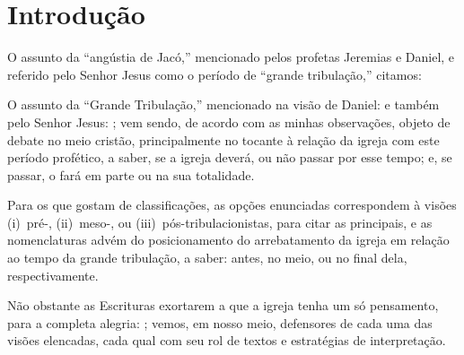 \section{Introdução}

    O assunto da ``angústia de Jacó,'' mencionado pelos profetas Jeremias e Daniel, e referido pelo Senhor Jesus como o período
    de ``grande tribulação,'' citamos:




    O assunto da ``Grande Tribulação,'' mencionado na visão de Daniel:  e também pelo  Senhor  Jesus:  ; vem sendo, de acordo com as minhas observações, objeto de debate no meio cristão, principalmente no
    tocante à relação da igreja com este período profético, a saber, se a igreja deverá, ou não passar por  esse  tempo;  e,  se
    passar, o fará em parte ou na sua totalidade.

    Para  os  que  gostam  de  classificações,  as  opções  enunciadas  correspondem   à   visões   (i)~pré-,   (ii)~meso-,   ou
    (iii)~pós-tribulacionistas, para citar as principais, e as nomenclaturas advém do posicionamento do arrebatamento da  igreja
    em relação ao tempo da grande tribulação, a saber: antes, no meio, ou no final dela, respectivamente.

    Não obstante as Escrituras exortarem a que a igreja tenha um só pensamento, para a completa alegria: ; vemos, em nosso meio, defensores de cada uma das visões elencadas,  cada  qual  com  seu  rol  de
    textos e estratégias de interpretação.

